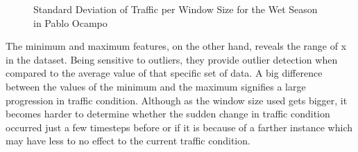 \begin{figure}[h] 
\centering
  \centering
  \caption{Standard Deviation of Traffic per Window Size for the Wet Season in Pablo Ocampo}
  \label{stDev}
\end{figure}


The minimum and maximum features, on the other hand, reveals the range of x in the dataset. Being sensitive to outliers, they provide outlier detection when compared to the average value of that specific set of data. A big difference between the values of the minimum and the maximum signifies a large progression in traffic condition. Although as the window size used gets bigger, it becomes harder to determine whether the sudden change in traffic condition occurred just a few timesteps before or if it is because of a farther instance which may have less to no effect to the current traffic condition. 

